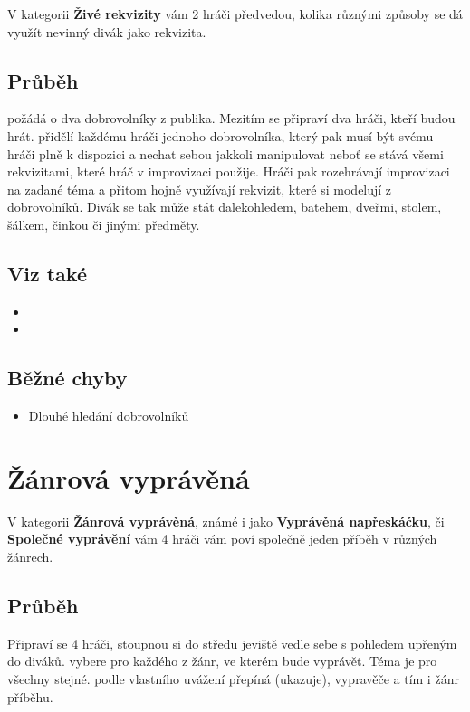 V kategorii \textbf{Živé rekvizity}{} vám 2 hráči předvedou, kolika různými způsoby se dá využít nevinný divák jako rekvizita. 
 
\subsection{ Průběh }  požádá o dva dobrovolníky z publika. Mezitím se připraví dva hráči, kteří budou hrát.  přidělí každému hráči jednoho dobrovolníka, který pak musí být svému hráči plně k dispozici a nechat  sebou jakkoli manipulovat neboť se stává všemi rekvizitami, které hráč v improvizaci použije. Hráči pak rozehrávají improvizaci na zadané téma a přitom hojně využívají rekvizit, které si modelují z dobrovolníků. Divák se tak může stát dalekohledem, batehem, dveřmi, stolem, šálkem, činkou či jinými předměty. 
 
\subsection{Viz také } \begin{itemize}
\item {}
\item {}
\end{itemize}
 
 
\subsection{ Běžné chyby } \begin{itemize}
\item Dlouhé hledání dobrovolníků
\end{itemize}
 
 
 
 
 
 
\needspace{5cm} \section{Žánrová vyprávěná} \label{žánrová vyprávěná}  
 
V kategorii \textbf{Žánrová vyprávěná}{}, známé i jako \textbf{Vyprávěná napřeskáčku}{}, či \textbf{Společné vyprávění}{}  vám 4 hráči vám poví společně jeden příběh v různých žánrech. 
 
\subsection{ Průběh } Připraví se 4 hráči, stoupnou si do středu jeviště vedle sebe s pohledem upřeným do diváků.  vybere pro každého z  žánr, ve kterém bude vyprávět. Téma je pro všechny stejné.  podle vlastního uvážení přepíná (ukazuje), vypravěče a tím i žánr příběhu. 
 
